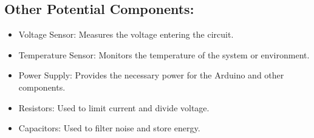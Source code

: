 \subsection{ Other Potential Components:}
\begin{itemize}
    \item Voltage Sensor: Measures the voltage entering the circuit.
    \item Temperature Sensor: Monitors the temperature of the system or environment.
    \item Power Supply: Provides the necessary power for the Arduino and other components.
    \item Resistors: Used to limit current and divide voltage.
    \item Capacitors: Used to filter noise and store energy.
\end{itemize}
